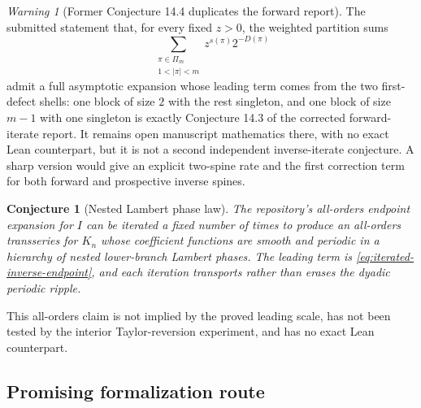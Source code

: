 \documentclass[11pt,oneside]{article}
\newtheorem{conjecture}[theorem]{Conjecture}
\theoremstyle{definition}
\theoremstyle{remark}
\newtheorem{warning}[theorem]{Warning}
\begin{document}
\begin{warning}[Former Conjecture 14.4 duplicates the forward report]
\label{warn:defect-duplicate}
The submitted statement that, for every fixed $z>0$, the weighted partition sums
\[
 \sum_{\substack{\pi\in\Pi_m\\1<|\pi|<m}}z^{s(\pi)}2^{-D(\pi)}
\]
admit a full asymptotic expansion whose leading term comes from the two first-defect
shells: one block of size $2$ with the rest singleton, and one block of size $m-1$ with
one singleton is exactly Conjecture 14.3 of the corrected forward-iterate report.
It remains open manuscript mathematics there, with no exact Lean counterpart, but it
is not a second independent inverse-iterate conjecture.  A sharp version would give an
explicit two-spine rate and the first correction term for both forward and prospective
inverse spines.
\end{warning}

\begin{conjecture}[Nested Lambert phase law]
\label{conj:nested-lambert}
The repository's all-orders endpoint expansion for $I$ can be iterated a fixed number
of times to produce an all-orders transseries for $K_n$ whose coefficient functions are
smooth and periodic in a hierarchy of nested lower-branch Lambert phases.  The leading
term is \eqref{eq:iterated-inverse-endpoint}, and each iteration transports rather than
erases the dyadic periodic ripple.
\end{conjecture}

This all-orders claim is not implied by the proved leading scale, has not been tested by
the interior Taylor-reversion experiment, and has no exact Lean counterpart.

\subsection{Promising formalization route}
\end{document}
